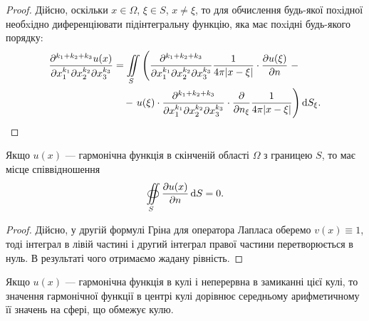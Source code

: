 \begin{proof}
	Дійсно, оскільки $x \in \Omega$, $\xi \in S$, $x \ne \xi$, то для обчислення будь-якої поxідної необxідно диференціювати підінтегральну функцію, яка має поxідні будь-якого порядку:
	\begin{equation}
		\begin{aligned}
			\frac{\partial^{k_1+k_2+k_3} u(x)}{\partial x_1^{k_1}\partial x_2^{k_2}\partial x_3^{k_3}} &= \displaystyle\iint\limits_S \left( \frac{\partial^{k_1 + k_2 + k_3}}{\partial x_1^{k_1} \partial x_2^{k_2} \partial x_3^{k_3}} \frac{1}{4 \pi |x - \xi|} \cdot \frac{\partial u(\xi)}{\partial n} \right. - \\
			& \quad - \left. u(\xi) \cdot \frac{\partial^{k_1 + k_2 + k_3}}{\partial x_1^{k_1} \partial x_2^{k_2} \partial x_3^{k_3}} \cdot \frac{\partial}{\partial n_\xi} \frac{1}{4 \pi |x - \xi|} \right) \mathop{}\!\mathrm{d} S_\xi.
		\end{aligned}
	\end{equation}
\end{proof}

\begin{property}
	Якщо $u(x)$ --- гармонічна функція в скінченій області $\Omega$ з границею $S$, то має місце співвідношення
	\begin{equation}
		\displaystyle\oiint\limits_S \frac{\partial u(x)}{\partial n} \mathop{}\!\mathrm{d} S = 0.
	\end{equation}
\end{property}

\begin{proof}
	Дійсно, у другій формулі Гріна для оператора Лапласа оберемо $v(x) \equiv 1$, тоді інтеграл в лівій частині і другий інтеграл правої частини перетворюється в нуль. В результаті чого отримаємо жадану рівність.
\end{proof}

\begin{theorem}
	Якщо $u(x)$ --- гармонічна функція в кулі і неперервна в замиканні цієї кулі, то значення гармонічної функції в центрі кулі дорівнює середньому арифметичному її значень на сфері, що обмежує кулю.
\end{theorem}

